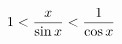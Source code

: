 \documentclass[preview]{standalone}
\begin{document}
\begin{align*}
\special{dvisvgm:raw <g id='unique000'>}1 < \frac{x}{\sin x} < \frac{1}{\cos x}\special{dvisvgm:raw </g>}
\end{align*}
\end{document}
